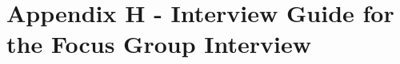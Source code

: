 \section*{Appendix H - Interview Guide for the Focus Group Interview}
\label{app:interviewGuide}
\begin{figure}[H] 
\end{figure}  
